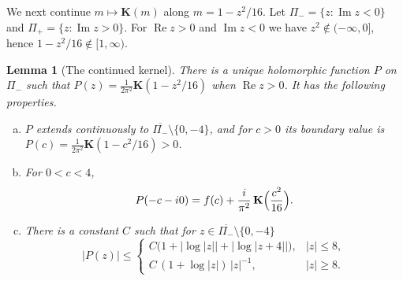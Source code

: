 \documentclass[11pt]{amsart}
\numberwithin{equation}{section}
\newtheorem{lemma}[theorem]{Lemma}
\theoremstyle{definition}
\theoremstyle{remark}
\newcommand{\Pim}{\Pi_{-}}
\newcommand{\Pip}{\Pi_{+}}
\DeclareMathOperator{\re}{Re}
\DeclareMathOperator{\im}{Im}
\newcommand{\Kc}{\mathbf{K}}
\begin{document}
We next continue $m\mapsto\Kc(m)$ along $m=1-z^2/16$. Let
$\Pim=\{z:\im z<0\}$ and $\Pip=\{z:\im z>0\}$. For $\re z>0$ and $\im z<0$ we
have $z^2\notin(-\infty,0]$, hence $1-z^2/16\notin[1,\infty)$.

\begin{lemma}[The continued kernel]\label{lem:P}
There is a unique holomorphic function $P$ on $\Pim$ such that
$P(z)=\frac{1}{2\pi^2}\Kc(1-z^2/16)$ when $\re z>0$. It has the following
properties.
\begin{enumerate}[(a)]
\item $P$ extends continuously to $\overline{\Pim}\setminus\{0,-4\}$, and for
$c>0$ its boundary value is $P(c)=\frac1{2\pi^2}\Kc(1-c^2/16)>0$.
\item For $0<c<4$,
\begin{equation}\label{eq:jump}
P(-c-i0)=f(c)+\frac{i}{\pi^2}\,\Kc\Bigl(\frac{c^2}{16}\Bigr).
\end{equation}
\item There is a constant $C$ such that for $z\in\overline{\Pim}\setminus\{0,-4\}$
\[
|P(z)|\le
\begin{cases}
C\bigl(1+\bigl|\log|z|\bigr|+\bigl|\log|z+4|\bigr|\bigr), & |z|\le8,\\[0.5ex]
C\,(1+\log|z|)\,|z|^{-1}, & |z|\ge8.
\end{cases}
\]
\end{enumerate}
\end{lemma}
\end{document}
